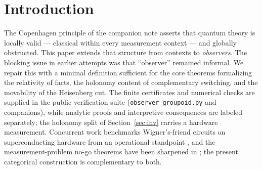 \documentclass[11pt]{article}
\begin{document}
\section{Introduction}
The Copenhagen principle of the companion note asserts that quantum theory is locally
valid --- classical within every measurement context --- and globally obstructed. This
paper extends that structure from contexts to \emph{observers}. The blocking issue in
earlier attempts was that ``observer'' remained informal. We repair this with a minimal
definition sufficient for the core theorems formalizing the relativity of facts, the
holonomy content of complementary switching, and the movability of the Heisenberg cut.
The finite certificates and numerical checks are supplied in the public verification suite
(\texttt{observer\_groupoid.py} and companions), while analytic proofs and interpretive
consequences are labeled separately; the holonomy split of Section~\ref{sec:inv} carries a
hardware measurement. Concurrent work benchmarks Wigner's-friend circuits on superconducting
hardware from an operational standpoint \cite{Altman26}, and the measurement-problem no-go
theorems have been sharpened in \cite{OVB26}; the present categorical construction is
complementary to both.
\end{document}
